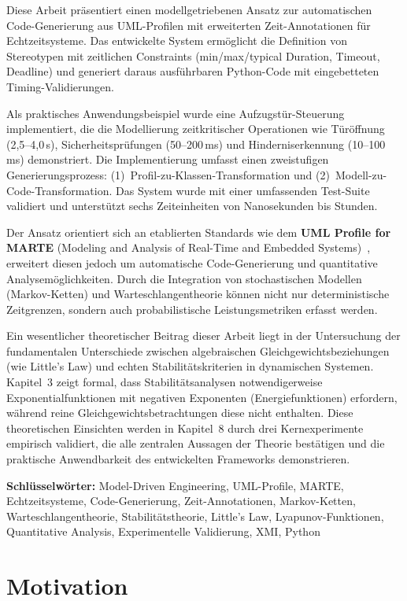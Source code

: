﻿\documentclass[a4paper,12pt]{report}
\theoremstyle{definition}
\begin{document}
Diese Arbeit präsentiert einen modellgetriebenen Ansatz zur automatischen
Code-Gene\-rierung aus UML-Profilen mit erweiterten Zeit-Annotationen für
Echtzeitsysteme. Das entwickelte System ermöglicht die Definition von
Stereotypen mit zeitlichen Constraints (min/max/typical Duration, Timeout,
Deadline) und generiert daraus ausführbaren Py\-thon-Code mit eingebetteten
Timing-Validierungen.

Als praktisches Anwendungsbeispiel wurde eine Aufzugstür-Steuerung
implementiert, die die Modellierung zeitkritischer Operationen wie
Türöffnung (2{,}5--4{,}0\,s), Sicherheitsprüfungen (50--200\,ms) und
Hinderniserkennung (10--100\,ms) demonstriert. Die Implementierung umfasst
einen zweistufigen Generierungsprozess: (1)~Profil-zu-Klassen-Transfor\-mation
und (2)~Modell-zu-Code-Transformation. Das System wurde mit einer
umfassenden Test-Suite validiert und unterstützt sechs Zeiteinheiten von
Nanosekunden bis Stunden.

Der Ansatz orientiert sich an etablierten Standards wie dem
\textbf{UML Profile for MARTE} (Modeling and Analysis of Real-Time and
Embedded Systems)~\cite{marte}, erweitert diesen jedoch um automatische
Code-Generierung und quantitative Analysemöglichkeiten. Durch die Integration
von stochastischen Modellen (Markov-Ketten) und Warteschlangentheorie
können nicht nur deterministische Zeitgrenzen, sondern auch probabilistische
Leistungsmetriken erfasst werden.

Ein wesentlicher theoretischer Beitrag dieser Arbeit liegt in der Untersuchung
der fundamentalen Unterschiede zwischen algebraischen Gleichgewichtsbeziehungen
(wie Little's Law) und echten Stabilitätskriterien in dynamischen Systemen.
Kapitel~3 zeigt formal, dass Stabilitätsanalysen notwendigerweise
Exponentialfunktionen mit negativen Exponenten (Energiefunktionen) erfordern,
während reine Gleichgewichtsbetrachtungen diese nicht enthalten. Diese
theoretischen Einsichten werden in Kapitel~8 durch drei Kernexperimente
empirisch validiert, die alle zentralen Aussagen der Theorie bestätigen und
die praktische Anwendbarkeit des entwickelten Frameworks demonstrieren.

\textbf{Schlüsselwörter:} Model-Driven Engineering, UML-Profile, MARTE,
Echtzeitsysteme, Code-Gene\-rierung, Zeit-Annotationen, Markov-Ketten,
Warteschlangentheorie, Stabilitätstheorie, Little's Law, Lyapunov-Funktionen,
Quantitative Analysis, Experimentelle Validierung, XMI, Python


\section{Motivation}
\end{document}

